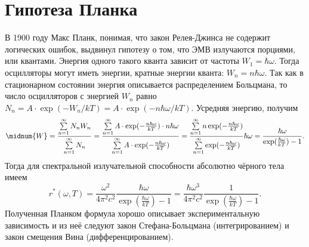 \section{Гипотеза Планка}
В 1900 году Макс Планк, понимая, что закон Релея-Джинса не содержит логических
ошибок, выдвинул гипотезу о том, что ЭМВ излучаются порциями, или квантами.
Энергия одного такого кванта зависит от частоты \( W_1 = \hbar\omega \).
Тогда осцилляторы могут иметь энергии, кратные энергии кванта:
\( W_n = n\hbar\omega \). Так как в стационарном состоянии энергия описывается
распределением Больцмана, то число осцилляторов с энергией \( W_n \) равно
\( N_n = A\cdot\exp(-W_n/kT) = A\cdot\exp(-n\hbar\omega/kT) \). Усредняя
энергию, получим
\[
    \midnum{W} =
    \frac{\sum\limits_{n=1}^\infty N_nW_n}{\sum\limits_{n=1}^\infty N_n} = 
    \frac{\sum\limits_{n=1}^\infty A\cdot\exp(-\frac{n\hbar\omega}{kT})\cdot
    n\hbar\omega}{\sum\limits_{n=1}^\infty A\cdot\exp(-\frac{n\hbar\omega}{kT})} =
    \frac{\sum\limits_{n=1}^\infty n\exp(-\frac{n\hbar\omega}{kT})}
    {\sum\limits_{n=1}^\infty \exp(-\frac{n\hbar\omega}{kT})}\hbar\omega =
    \frac{\hbar\omega}{\exp(\frac{\hbar\omega}{kT}) - 1}.
\]
Тогда для спектральной излучательной способности абсолютно чёрного тела имеем
\[
    r^*(\omega, T) = \frac{\omega^2}{4\pi^2c^2}
    \frac{\hbar\omega}{\exp(\frac{\hbar\omega}{kT}) - 1} = \frac{\hbar\omega^3}
    {4\pi^2c^2}\frac{1}{\exp(\frac{\hbar\omega}{kT}) - 1}.
\]
Полученная Планком формула хорошо описывает экспериментальную зависимость и из
неё следуют закон Стефана-Больцмана (интегрированием) и закон смещения Вина
(дифференцированием).
\newpage

